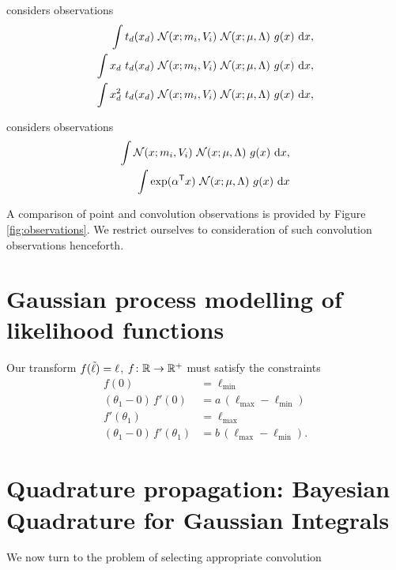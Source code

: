 \documentclass[twoside]{article}
\begin{document}
\ep considers observations
\begin{align}
 \int t_d(x_d)~\mathcal{N}(x;m_i,V_i)~\mathcal{N}(x;\mu,\Lambda)~g(x)~\mathrm{d} x,\\
  \int x_d~t_d(x_d)~\mathcal{N}(x;m_i,V_i)~\mathcal{N}(x;\mu,\Lambda)~g(x)~\mathrm{d} x,\\
 \int x_d^2~t_d(x_d)~\mathcal{N}(x;m_i,V_i)~\mathcal{N}(x;\mu,\Lambda)~g(x)~\mathrm{d} x,
\end{align}

\vb \citep{Gibbs_MacKay97b} considers observations
\begin{align}
 \int \mathcal{N}(x;m_i,V_i)~\mathcal{N}(x;\mu,\Lambda)~g(x)~\mathrm{d} x,\\
\int \exp(\alpha^\mathsf{T} x)~\mathcal{N}(x;\mu,\Lambda)~g(x)~\mathrm{d} x
\end{align}



A comparison of point and convolution observations is provided by Figure \ref{fig:observations}. 
We restrict ourselves to consideration of such convolution observations henceforth.

\section{Gaussian process modelling of likelihood functions}

Our transform $f({\tilde{\ell}}) = \ell$, $f\colon \mathbb{R} \to \mathbb{R}^+$ must satisfy the constraints
\begin{align}
 f(0) & = \ell_\text{min} \label{eq:f_constraint_1}\\
 (\theta_1 - 0)\, f'(0) & = a\,(\ell_\text{max} - \ell_\text{min}) \label{eq:f_constraint_2}\\
 f'(\theta_1) & = \ell_\text{max} 
\label{eq:f_constraint_3}\\
 (\theta_1 - 0)\, f'(\theta_1) & = b\,(\ell_\text{max} - \ell_\text{min}). 
\label{eq:f_constraint_4}
\end{align}



\begin{figure*}
\caption{}
\end{figure*}


\section{Quadrature propagation: Bayesian Quadrature for Gaussian Integrals}
\label{sec:active}

We now turn to the problem of selecting appropriate convolution 



\end{document}
